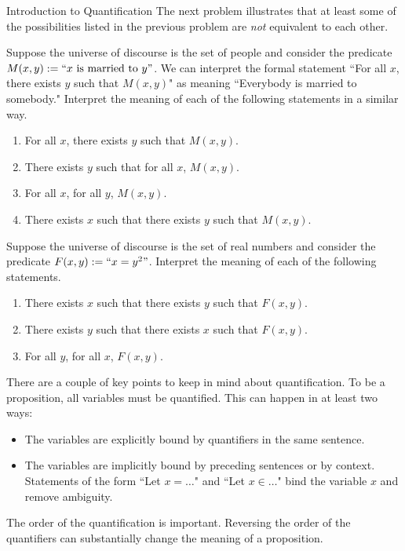 \begin{section}{Introduction to Quantification}
The next problem illustrates that at least some of the possibilities listed in the previous problem are \emph{not} equivalent to each other.

\begin{problem}
Suppose the universe of discourse is the set of people and consider the predicate $M(x,y):=``x\mbox{ is married to }y"$.  We can interpret the formal statement ``For all $x$, there exists $y$ such that $M(x,y)$" as meaning ``Everybody is married to somebody."  Interpret the meaning of each of the following statements in a similar way.
\begin{enumerate}[label=\textrm{(\alph*)}]
\item For all $x$, there exists $y$ such that $M(x,y)$.
\item There exists $y$ such that for all $x$, $M(x,y)$.
\item For all $x$, for all $y$, $M(x,y)$.
\item There exists $x$ such that there exists $y$ such that $M(x,y)$.
\end{enumerate}
\end{problem}

\begin{problem}
Suppose the universe of discourse is the set of real numbers and consider the predicate $F(x,y):=``x=y^2"$. Interpret the meaning of each of the following statements.
\begin{enumerate}[label=\textrm{(\alph*)}]
\item There exists $x$ such that there exists $y$ such that $F(x,y)$.
\item There exists $y$ such that there exists $x$ such that $F(x,y)$.
\item For all $y$, for all $x$, $F(x,y)$.
\end{enumerate}
\end{problem}


There are a couple of key points to keep in mind about quantification. To be a proposition, all variables must be quantified.  This can happen in at least two ways:
\begin{itemize}
\item The variables are explicitly bound by quantifiers in the same sentence.
\item The variables are implicitly bound by preceding sentences or by context. Statements of the form ``Let $x=\ldots$" and ``Let $x\in\ldots$" bind the variable $x$ and remove ambiguity.
\end{itemize}
The order of the quantification is important.  Reversing the order of the quantifiers can substantially change the meaning of a proposition.


\end{section}
